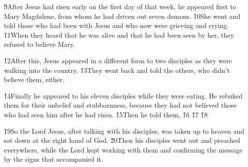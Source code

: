 \v{9}After Jesus had risen early on the first day of that week, he appeared first to Mary Magdalene, from whom he had driven out seven demons. \v{10}She went and told those who had been with Jesus and who now were grieving and crying. \v{11}When they heard that he was alive and that he had been seen by her, they refused to believe Mary.

\v{12}After this, Jesus appeared in a different form to two disciples as they were walking into the country. \v{13}They went back and told the others, who didn't believe them, either.

\v{14}Finally he appeared to his eleven disciples while they were eating. He rebuked them for their unbelief and stubbornness, because they had not believed those who had seen him after he had risen. \v{15}Then he told them,  \v{16} \v{17} \v{18}

\v{19}So the Lord Jesus, after talking with his disciples, was taken up to heaven and sat down at the right hand of God. \v{20}Then his disciples went out and preached everywhere, while the Lord kept working with them and confirming the message by the signs that accompanied it.

